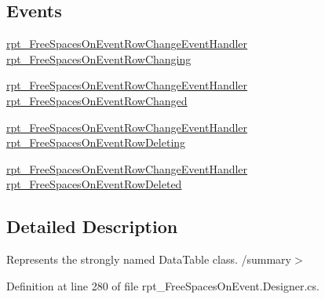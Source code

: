 \subsection*{Events}
\begin{DoxyCompactItemize}
\item 
\hyperlink{classprj_progra_i_i_i_1_1rpt___free_spaces_on_event_a19ccb59e3a6fc2f077280510cfdf1d21}{rpt\+\_\+\+Free\+Spaces\+On\+Event\+Row\+Change\+Event\+Handler} \hyperlink{classprj_progra_i_i_i_1_1rpt___free_spaces_on_event_1_1rpt___free_spaces_on_event_data_table_ada76c92209f07de6c76858a211c977a7}{rpt\+\_\+\+Free\+Spaces\+On\+Event\+Row\+Changing}
\item 
\hyperlink{classprj_progra_i_i_i_1_1rpt___free_spaces_on_event_a19ccb59e3a6fc2f077280510cfdf1d21}{rpt\+\_\+\+Free\+Spaces\+On\+Event\+Row\+Change\+Event\+Handler} \hyperlink{classprj_progra_i_i_i_1_1rpt___free_spaces_on_event_1_1rpt___free_spaces_on_event_data_table_a127b0acb0afa0c6757a1ebb6a7717101}{rpt\+\_\+\+Free\+Spaces\+On\+Event\+Row\+Changed}
\item 
\hyperlink{classprj_progra_i_i_i_1_1rpt___free_spaces_on_event_a19ccb59e3a6fc2f077280510cfdf1d21}{rpt\+\_\+\+Free\+Spaces\+On\+Event\+Row\+Change\+Event\+Handler} \hyperlink{classprj_progra_i_i_i_1_1rpt___free_spaces_on_event_1_1rpt___free_spaces_on_event_data_table_a8b5d9adc84f252e2b71c14a57c5e65c3}{rpt\+\_\+\+Free\+Spaces\+On\+Event\+Row\+Deleting}
\item 
\hyperlink{classprj_progra_i_i_i_1_1rpt___free_spaces_on_event_a19ccb59e3a6fc2f077280510cfdf1d21}{rpt\+\_\+\+Free\+Spaces\+On\+Event\+Row\+Change\+Event\+Handler} \hyperlink{classprj_progra_i_i_i_1_1rpt___free_spaces_on_event_1_1rpt___free_spaces_on_event_data_table_a87eff98bca7a64ea0fac5dd531f46a03}{rpt\+\_\+\+Free\+Spaces\+On\+Event\+Row\+Deleted}
\end{DoxyCompactItemize}


\subsection{Detailed Description}
Represents the strongly named Data\+Table class. /summary$>$ 

Definition at line 280 of file rpt\+\_\+\+Free\+Spaces\+On\+Event.\+Designer.\+cs.



